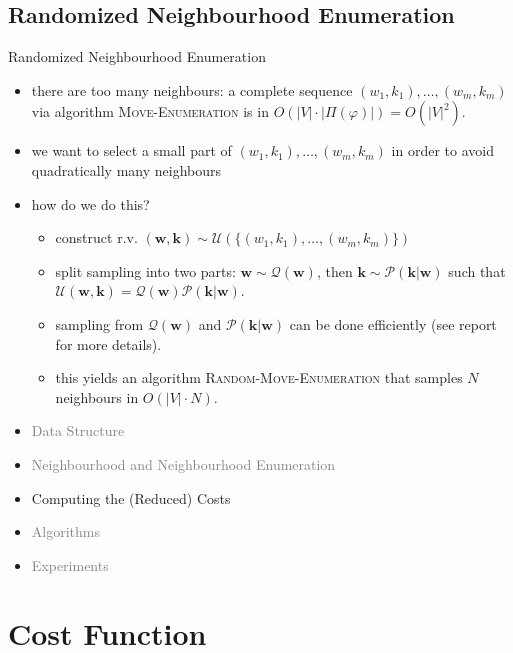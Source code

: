 \documentclass[10pt]{beamer}
\newcommand{\wf}{\mathbf{w}}
\newcommand{\kf}{\mathbf{k}}
\newcommand{\Qc}{\mathcal{Q}}
\newcommand{\Uc}{\mathcal{U}}
\newcommand{\Pc}{\mathcal{P}}
\newcommand{\idx}{\varphi}
\begin{document}
\subsection*{Randomized Neighbourhood Enumeration}
\begin{frame}{Randomized Neighbourhood Enumeration}
    \begin{itemize}
        \item there are too many neighbours: a complete sequence $(w_1,k_1),\dots,(w_m,k_m)$ via algorithm \textsc{Move-Enumeration} is in $O(|V|\cdot |\Pi(\idx)|) = O(|V|^2)$.
        \item we want to select a small part of $(w_1,k_1),\dots,(w_m,k_m)$ in order to avoid quadratically many neighbours
        \item how do we do this?
        \pause
        \begin{itemize} 
            \item construct r.v. $(\wf, \kf) \sim \Uc(\{(w_1,k_1),\dots,(w_m,k_m)\})$
            \item split sampling into two parts: $\wf \sim \Qc(\wf)$, then $\kf \sim \Pc(\kf | \wf)$ such that $\Uc(\wf, \kf) = \Qc(\wf)\Pc(\kf|\wf)$.
            \item sampling from $\Qc(\wf)$ and $\Pc(\kf|\wf)$ can be done efficiently (see report for more details).
            \item this yields an algorithm \textsc{Random-Move-Enumeration} that samples $N$ neighbours in $O(|V|\cdot N)$.
        \end{itemize}
    \end{itemize}
\end{frame}


\begin{frame}
    \begin{itemize}
        \item \textcolor{gray}{Data Structure}
        \item \textcolor{gray}{Neighbourhood and Neighbourhood Enumeration}
        \item Computing the (Reduced) Costs
        \item \textcolor{gray}{Algorithms}
        \item \textcolor{gray}{Experiments}
    \end{itemize}
\end{frame}

\section{Cost Function}
\end{document}
